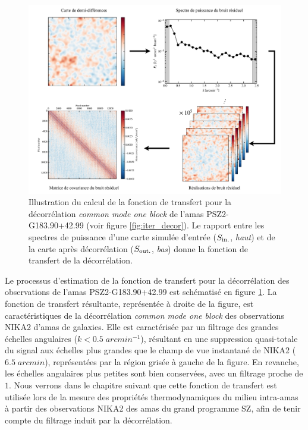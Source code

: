 \begin{figure}[t]
    \centering
    \includegraphics[width=.99\linewidth, page=2]{Figures/Chap_decor/schema_pk_tf.pdf}
    \caption{
        Illustration du calcul de la fonction de transfert pour la décorrélation \textit{common mode one block} de l'amas PSZ2-G183.90+42.99 (voir figure \ref{fig:iter_decor}).
        Le rapport entre les spectres de puissance d'une carte simulée d'entrée ($S_{\rm in.}$, \textit{haut}) et de la carte après décorrélation ($S_{\rm out.}$, \textit{bas}) donne la fonction de transfert de la décorrélation.
    }
    \label{fig:tf_schema}
\end{figure}

Le processus d'estimation de la fonction de transfert pour la décorrélation des observations de l'amas PSZ2-G183.90+42.99 est schématisé en figure \ref{fig:tf_schema}.
La fonction de transfert résultante, représentée à droite de la figure, est caractéristiques de la décorrélation \textit{common mode one block} des observations NIKA2 d'amas de galaxies.
Elle est caractérisée par un filtrage des grandes échelles angulaires ($k < 0.5 \;\unit{arcmin^{-1}}$), résultant en une suppression quasi-totale du signal aux échelles plus grandes que le champ de vue instantané de NIKA2 ($6.5 \;\unit{arcmin}$), représentées par la région grisée à gauche de la figure.
En revanche, les échelles angulaires plus petites sont bien conservées, avec un filtrage proche de $1$.
Nous verrons dans le chapitre suivant que cette fonction de transfert est utilisée lors de la mesure des propriétés thermodynamiques du milieu intra-amas à partir des observations NIKA2 des amas du grand programme SZ, afin de tenir compte du filtrage induit par la décorrélation.

